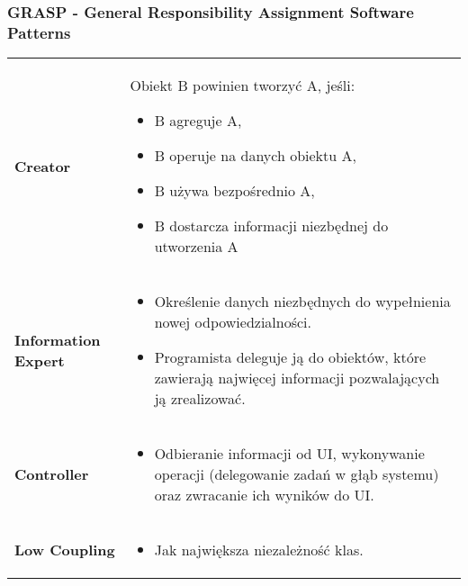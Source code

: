 \documentclass[a4paper]{article}
\begin{document}
    \subsubsection{GRASP - General Responsibility Assignment Software Patterns}
    \begin{table}[H]
        \begin{center}
            \begin{tabular}{  p{3cm} p{12cm}  }
                \textbf{Creator}
                &
                Obiekt B powinien tworzyć A, jeśli:
                \begin{itemize}
                    \item B agreguje A,
                    \item B operuje na danych obiektu A,
                    \item B używa bezpośrednio A,
                    \item B dostarcza informacji niezbędnej do utworzenia A
                \end{itemize}
                \\

                \textbf{Information Expert}
                &
                \begin{itemize}
                    \item Określenie danych niezbędnych do wypełnienia nowej odpowiedzialności.
                    \item Programista deleguje ją do obiektów, które
                    zawierają najwięcej informacji pozwalających ją zrealizować.
                \end{itemize}
                \\

                \textbf{Controller}
                &
                \begin{itemize}
                    \item Odbieranie informacji od UI, wykonywanie operacji (delegowanie zadań w głąb systemu) oraz zwracanie ich wyników do UI.
                \end{itemize}
                \\

                \textbf{Low Coupling}
                &
                \begin{itemize}
                    \item Jak największa niezależność klas.
                \end{itemize}
                \\


\end{tabular}
\end{center}
\end{table}
\end{document}
